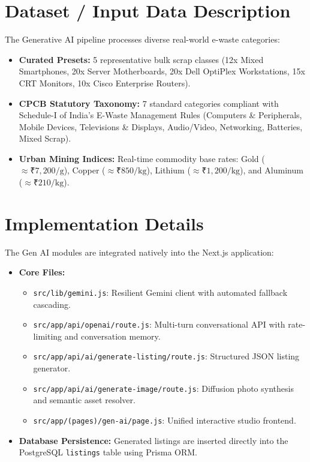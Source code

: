 \documentclass[12pt,a4paper]{article}
\begin{document}
\section{Dataset / Input Data Description}
The Generative AI pipeline processes diverse real-world e-waste categories:
\begin{itemize}
    \item \textbf{Curated Presets:} 5 representative bulk scrap classes (12x Mixed Smartphones, 20x Server Motherboards, 20x Dell OptiPlex Workstations, 15x CRT Monitors, 10x Cisco Enterprise Routers).
    \item \textbf{CPCB Statutory Taxonomy:} 7 standard categories compliant with Schedule-I of India's E-Waste Management Rules (Computers \& Peripherals, Mobile Devices, Televisions \& Displays, Audio/Video, Networking, Batteries, Mixed Scrap).
    \item \textbf{Urban Mining Indices:} Real-time commodity base rates: Gold ($\approx ₹7,200/\text{g}$), Copper ($\approx ₹850/\text{kg}$), Lithium ($\approx ₹1,200/\text{kg}$), and Aluminum ($\approx ₹210/\text{kg}$).
\end{itemize}

\section{Implementation Details}
The Gen AI modules are integrated natively into the Next.js application:
\begin{itemize}
    \item \textbf{Core Files:}
    \begin{itemize}
        \item \texttt{src/lib/gemini.js}: Resilient Gemini client with automated fallback cascading.
        \item \texttt{src/app/api/openai/route.js}: Multi-turn conversational API with rate-limiting and conversation memory.
        \item \texttt{src/app/api/ai/generate-listing/route.js}: Structured JSON listing generator.
        \item \texttt{src/app/api/ai/generate-image/route.js}: Diffusion photo synthesis and semantic asset resolver.
        \item \texttt{src/app/(pages)/gen-ai/page.js}: Unified interactive studio frontend.
    \end{itemize}
    \item \textbf{Database Persistence:} Generated listings are inserted directly into the PostgreSQL \texttt{listings} table using Prisma ORM.
\end{itemize}
\end{document}
